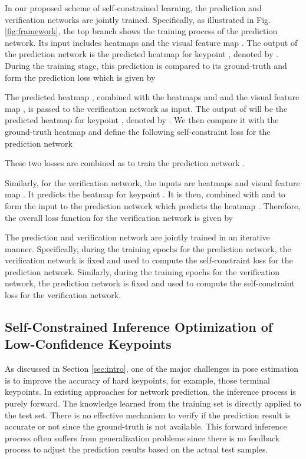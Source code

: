 \documentclass[runningheads]{llncs}
\begin{document}
In our proposed scheme of self-constrained learning, the prediction and verification networks are jointly trained. Specifically, as illustrated in Fig. \ref{fig:framework}, the top branch shows the training process of the prediction network. Its input includes heatmaps 
  and the visual feature map .
The output of the prediction network is the predicted heatmap for keypoint , denoted by . 
During the training stage, this prediction is compared to its ground-truth  and form the prediction loss  which is given by 

The predicted heatmap , combined with 
the heatmaps  and  and the visual feature map , is passed to the verification network  as input.  The output of  will be the predicted heatmap for keypoint , denoted by .  
We then compare it with the ground-truth heatmap  and define the following self-constraint loss for the prediction network

These two losses are combined as  to train the prediction network .

Similarly, for the verification network, the inputs are heatmaps 
 and visual feature map . It predicts the heatmap  for keypoint . It is then, combined with  and  to form the input to the prediction network  which predicts the 
heatmap . Therefore, the overall loss function for the verification network is given by 

The prediction and verification network are jointly trained in an iterative manner. Specifically, during the training epochs for the prediction network, the verification network is fixed and used to compute the self-constraint loss for the prediction network. Similarly, during the training epochs for the verification network, the prediction network is fixed and used to compute the self-constraint loss for the verification network.


\subsection{Self-Constrained Inference Optimization of Low-Confidence Keypoints}
\label{sec:slo}

As discussed in Section \ref{sec:intro}, one of the major challenges in pose estimation is to improve the accuracy of hard keypoints, for example, those terminal keypoints. 
In existing approaches for network prediction, the inference process is purely forward. The knowledge learned from the training set is directly applied to the test set. There is no effective mechanism to verify if the prediction result is accurate or not since the ground-truth is not available. This  forward inference process often suffers from generalization problems since  there is no feedback process to adjust the prediction results based on the actual test samples. 
\end{document}
